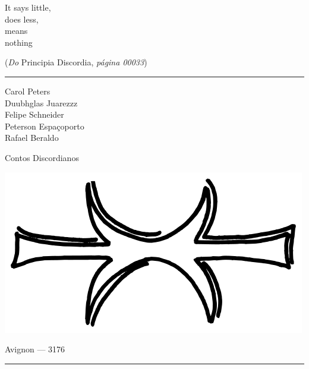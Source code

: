 \thispagestyle{empty}
\begin{center}
\vspace*{\fill}
\begin{flushright}
{\large\foreignlanguage{english}{It says little,\\
does less, \\
means \\
nothing} \\}

{\tiny (\emph{Do} Principia Discordia, \emph{página 00033})}
\end{flushright}
\end{center}
\cleardoublepage

\thispagestyle{empty}

\hrule

\begin{center}
{\scriptsize
Carol Peters\\
Duubhglas Juarezzz\\
Felipe Schneider\\
Peterson Espaçoporto\\
Rafael Beraldo\\
}
\vspace{.5cm}

{\Large Contos Discordianos}

\vspace{2cm}

\includegraphics[scale=.35]{eris_hand}

\vfill

Avignon --- 3176
\vspace{.5em}
\hrule

\end{center}
\newpage

